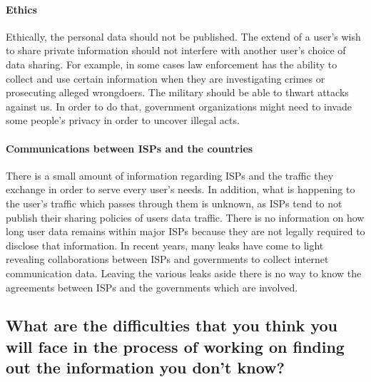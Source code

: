 \paragraph{Ethics\\}
Ethically, the personal data should not be published. The extend of a user's 
wish to share private information should not interfere with another user's 
choice of data sharing. For example, in some cases law enforcement has the 
ability to collect and use certain information when they are investigating 
crimes or prosecuting alleged wrongdoers. The military  should  be able to 
thwart attacks against us. In order to do that, government organizations might 
need to invade some people's privacy in order to uncover illegal acts. 


\paragraph{Communications between ISPs and the countries\\}
There is a small amount of information regarding ISPs and the traffic they 
exchange in order to serve every user's needs. In addition, what is happening to
the user's traffic which passes through them is unknown, as ISPs tend to not 
publish their sharing policies of users data traffic. There is no information on 
how long user data remains within major ISPs because they are not legally 
required to disclose that information. In recent years, many leaks have come to 
light revealing collaborations between ISPs and governments to collect internet 
communication data. Leaving the various leaks aside there is no way to know the 
agreements between ISPs and the governments which are involved. 


\subsection{What are the difficulties that you think you will face in the 
process of working on finding out the information you don't know?}

